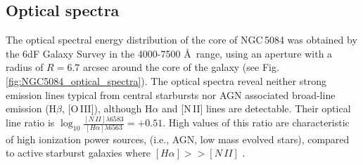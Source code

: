 \documentclass[modern]{CORE-AAS/aastex631}
\begin{document}
\subsection{Optical spectra} \label{subsec:results_Optical_spectra}
The optical spectral energy distribution of the core of NGC\,5084 was obtained by the 6dF Galaxy Survey \citep{jones+2004mnras355_747} in the 4000-7500 \AA\ range, using an aperture with a radius of $R=6.7$ arcsec around the core of the galaxy (see Fig.\,\ref{fig:NGC5084_optical_spectra}). The optical spectra reveal neither strong emission lines typical from central starbursts nor AGN associated broad-line emission (H$\beta$, [O\,III]), although H$\alpha$ and [N\,II] lines are detectable. Their optical line ratio is $\log_{10} \frac{[N\,II]\lambda6583}{[H\alpha]\lambda6563} = +0.51$. High values of this ratio are characteristic of high ionization power sources, (i.e., AGN, low mass evolved
stars), compared to active starburst galaxies where $[H\alpha] >> [N\,II]$ \citep{sanchezalmeida+2012apj756_163}. 
\end{document}
